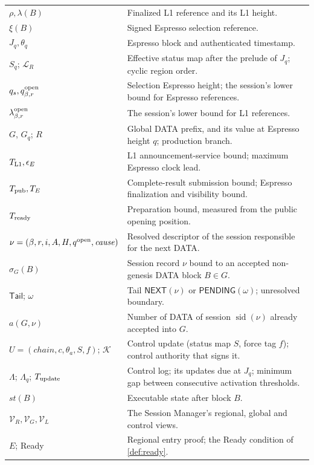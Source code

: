 \documentclass[11pt,a4paper]{article}
\newcommand{\tagg}[1]{\ensuremath{\mathsf{#1}}}
\begin{document}
\begin{table}[htbp]
\begin{tabularx}{\linewidth}{@{}p{.32\linewidth}Y@{}}
$\rho,\lambda(B)$ & Finalized L1 reference and its L1 height.\\
$\xi(B)$ & Signed Espresso selection reference.\\
$J_q,\theta_q$ & Espresso block and authenticated timestamp.\\
$S_q$; $\mathcal L_R$ & Effective status map after the prelude of $J_q$; cyclic region order.\\
$q_s,q_{\beta,r}^{\rm open}$ & Selection Espresso height; the session's lower bound for Espresso references.\\
$\lambda_{\beta,r}^{\rm open}$ & The session's lower bound for L1 references.\\
$G$, $G_q$; $R$ & Global DATA prefix, and its value at Espresso height $q$; production branch.\\
$T_{\rm L1},\epsilon_E$ & L1 announcement-service bound; maximum Espresso clock lead.\\
$T_{\rm pub},T_E$ & Complete-result submission bound; Espresso finalization and visibility bound.\\
$T_{\rm ready}$ & Preparation bound, measured from the public opening position.\\
$\nu=(\beta,r,i,A,H,q^{\rm open},\mathit{cause})$ & Resolved descriptor of the session responsible for the next DATA.\\
$\sigma_G(B)$ & Session record $\nu$ bound to an accepted non-genesis DATA block $B\in G$.\\
$\mathsf{Tail}$; $\omega$ & Tail $\tagg{NEXT}(\nu)$ or $\tagg{PENDING}(\omega)$; unresolved boundary.\\
$a(G,\nu)$ & Number of DATA of session $\operatorname{sid}(\nu)$ already accepted into $G$.\\
$U=(\mathit{chain},c,\theta_a,S,f)$; $\mathcal K$ & Control update (status map $S$, force tag $f$); control authority that signs it.\\
$\Lambda$; $\Lambda_q$; $T_{\rm update}$ & Control log; its updates due at $J_q$; minimum gap between consecutive activation thresholds.\\
$\mathit{st}(B)$ & Executable state after block $B$.\\
$\mathcal V_R,\mathcal V_G,\mathcal V_L$ & The Session Manager's regional, global and control views.\\
$E$; Ready & Regional entry proof; the Ready condition of \cref{def:ready}.\\
\bottomrule\end{tabularx}
\end{table}
\end{document}
